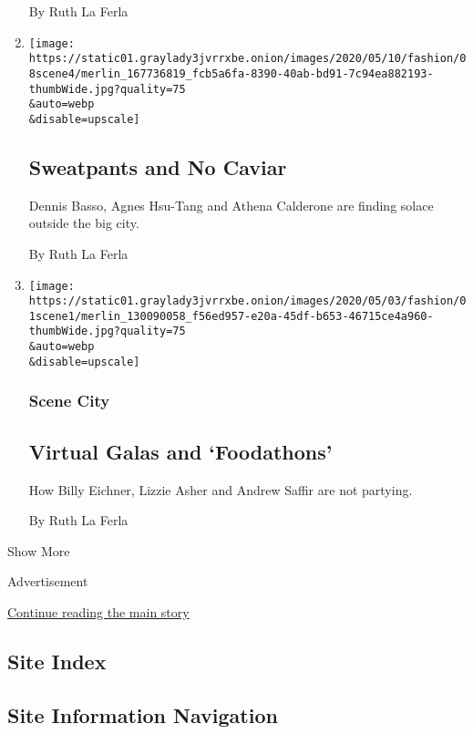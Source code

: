 \begin{enumerate}
  By Ruth La Ferla
\item
  \href{/2020/05/08/style/sweatpants-and-no-caviar.html}{}

  \texttt{[image: https://static01.graylady3jvrrxbe.onion/images/2020/05/10/fashion/08scene4/merlin\_167736819\_fcb5a6fa-8390-40ab-bd91-7c94ea882193-thumbWide.jpg?quality=75\\\&auto=webp\\\&disable=upscale]}

  \hypertarget{sweatpants-and-no-caviar}{%
  \subsection{Sweatpants and No Caviar}\label{sweatpants-and-no-caviar}}

  Dennis Basso, Agnes Hsu-Tang and Athena Calderone are finding solace
  outside the big city.

  By Ruth La Ferla
\item
  \href{/2020/05/01/style/virtual-galas-and-foodathons.html}{}

  \texttt{[image: https://static01.graylady3jvrrxbe.onion/images/2020/05/03/fashion/01scene1/merlin\_130090058\_f56ed957-e20a-45df-b653-46715ce4a960-thumbWide.jpg?quality=75\\\&auto=webp\\\&disable=upscale]}

  \hypertarget{scene-city-2}{%
  \subsubsection{Scene City}\label{scene-city-2}}

  \hypertarget{virtual-galas-and-foodathons}{%
  \subsection{Virtual Galas and
  `Foodathons'}\label{virtual-galas-and-foodathons}}

  How Billy Eichner, Lizzie Asher and Andrew Saffir are not partying.

  By Ruth La Ferla
\end{enumerate}

Show More

Advertisement

\protect\hyperlink{after-mid2}{Continue reading the main story}

\hypertarget{site-index}{%
\subsection{Site Index}\label{site-index}}

\hypertarget{site-information-navigation}{%
\subsection{Site Information
Navigation}\label{site-information-navigation}}

